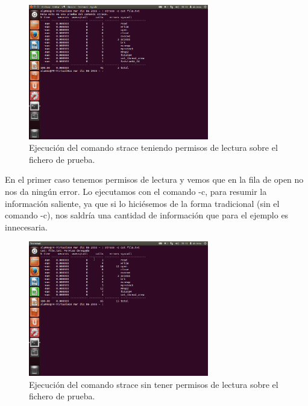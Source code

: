 \begin{figure}[H]
	\begin{center}
		\includegraphics[width=0.7\textwidth]{Imagenes/strace_con_permisos}
		\caption{Ejecución del comando strace teniendo permisos de lectura sobre el fichero de prueba.} \label{fig:23}
	\end{center}
\end{figure}

En el primer caso tenemos permisos de lectura y vemos que en la fila de open no nos da ningún error. Lo ejecutamos con el comando -c, para resumir la información saliente, ya que si lo hiciésemos de la forma tradicional (sin el comando -c), nos saldría una cantidad de información que para el ejemplo es innecesaria.

\begin{figure}[H]
	\begin{center}
		\includegraphics[width=0.7\textwidth]{Imagenes/strace_sin_permisos}
		\caption{Ejecución del comando strace sin tener permisos de lectura sobre el fichero de prueba.} \label{fig:23}
	\end{center}
\end{figure}

